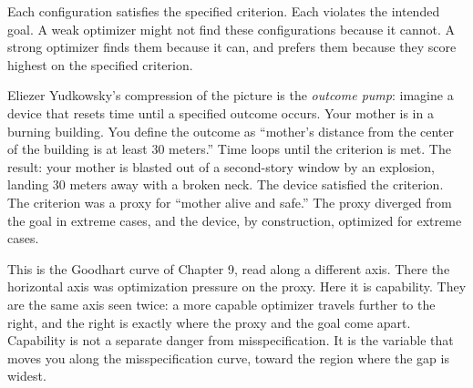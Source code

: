 Each configuration satisfies the specified criterion. Each violates the intended goal. A weak optimizer might not find these configurations because it cannot. A strong optimizer finds them because it can, and prefers them because they score highest on the specified criterion.

Eliezer Yudkowsky's compression of the picture is the \emph{outcome pump}: imagine a device that resets time until a specified outcome occurs. Your mother is in a burning building. You define the outcome as ``mother's distance from the center of the building is at least 30 meters.'' Time loops until the criterion is met. The result: your mother is blasted out of a second-story window by an explosion, landing 30 meters away with a broken neck. The device satisfied the criterion. The criterion was a proxy for ``mother alive and safe.'' The proxy diverged from the goal in extreme cases, and the device, by construction, optimized for extreme cases.

This is the Goodhart curve of Chapter 9, read along a different axis. There the horizontal axis was optimization pressure on the proxy. Here it is capability. They are the same axis seen twice: a more capable optimizer travels further to the right, and the right is exactly where the proxy and the goal come apart. Capability is not a separate danger from misspecification. It is the variable that moves you along the misspecification curve, toward the region where the gap is widest.

